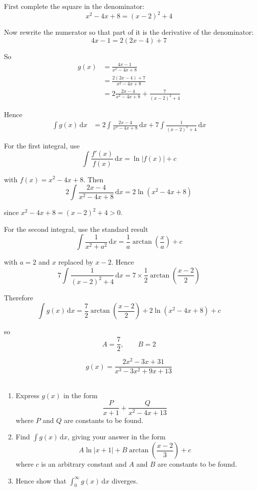 \documentclass[leqno]{article}
\begin{document}
\begin{enumerate}[
  label=\textbf{\arabic*.},
  leftmargin=*,
  topsep=0pt,
  partopsep=0pt,
  parsep=0pt
]
\vspace*{10pt}

\begin{djsSolution}
First complete the square in the denominator:
\[
x^2-4x+8=(x-2)^2+4
\]

Now rewrite the numerator so that part of it is the derivative of the denominator:
\[
4x-1=2(2x-4)+7
\]

So
\begin{align*}
g(x)
&=\frac{4x-1}{x^2-4x+8} \\
&=\frac{2(2x-4)+7}{x^2-4x+8} \\
&=2\frac{2x-4}{x^2-4x+8}+\frac{7}{(x-2)^2+4}
\end{align*}

Hence
\begin{align*}
\int g(x)\,\mathrm{d}x
&=2\int \frac{2x-4}{x^2-4x+8}\,\mathrm{d}x
+7\int \frac{1}{(x-2)^2+4}\,\mathrm{d}x
\end{align*}

For the first integral, use
\[
\int \frac{f'(x)}{f(x)}\,\mathrm{d}x=\ln|f(x)|+c
\]

with \(f(x)=x^2-4x+8\). Then
\[
2\int \frac{2x-4}{x^2-4x+8}\,\mathrm{d}x
=2\ln(x^2-4x+8)
\]

since \(x^2-4x+8=(x-2)^2+4>0\).

For the second integral, use the standard result
\[
\int \frac{1}{x^2+a^2}\,\mathrm{d}x
=\frac{1}{a}\arctan\left(\frac{x}{a}\right)+c
\]

with \(a=2\) and \(x\) replaced by \(x-2\). Hence
\[
7\int \frac{1}{(x-2)^2+4}\,\mathrm{d}x
=7\times\frac{1}{2}\arctan\left(\frac{x-2}{2}\right)
\]

Therefore
\[
\int g(x)\,\mathrm{d}x
=\frac{7}{2}\arctan\left(\frac{x-2}{2}\right)+2\ln(x^2-4x+8)+c
\]

so
\[
A=\frac{7}{2},
\qquad
B=2
\]
\end{djsSolution}


\newpage

\questionitem

\[
g(x)=\frac{2x^2-3x+31}{x^3-3x^2+9x+13}
\]
\\
\begin{enumerate}[label=\textbf{(\alph*)}]
  \item Express $g(x)$ in the form \[\frac{P}{x+1}+\frac{Q}{x^2-4x+13}\] where $P$ and $Q$ are constants to be found.  \\
  \item Find $\int g(x)\,\mathrm{d}x$, giving your answer in the form \[A\ln|x+1|+B\arctan\left(\frac{x-2}{3}\right)+c\] where $c$ is an arbitrary constant and $A$ and $B$ are constants to be found.  \\
  \item Hence show that $\int_0^\infty g(x)\,\mathrm{d}x$ diverges.  \\
\end{enumerate}


\end{enumerate}
\end{document}
